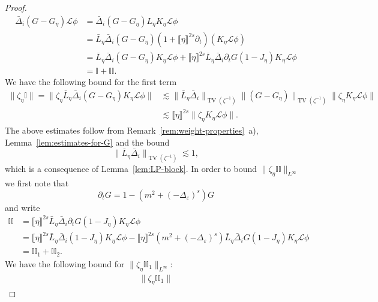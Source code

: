 \documentclass{article}
\numberwithin{equation}{section}
\theoremstyle{plain}
\theoremstyle{definition}
\begin{document}
\begin{proof}
\begin{align*}
    \bar{\Delta}_i  (G - G_{\eta}) \mathcal{L} \phi &=  \bar{\Delta}_i  (G - G_{\eta})
    L_{\eta} K_{\eta} \mathcal{L} \phi\\
 &=  \bar{L}_{\eta} \bar{\Delta}_i  (G - G_{\eta}) (1 + \llbracket \eta
    \rrbracket^{2 s} \partial_t) (K_{\eta} \mathcal{L} \phi)\\
 &=  \bar{L}_{\eta} \bar{\Delta}_i  (G - G_{\eta}) K_{\eta} \mathcal{L}
    \phi + \llbracket \eta \rrbracket^{2 s} \bar{L}_{\eta} \bar{\Delta}_i 
    \partial_t G (1 - J_{\eta}) K_{\eta} \mathcal{L} \phi\\
 &=  \mathbb{I}+\mathbb{I}\mathbb{I}.
  \end{align*}
  We have the following bound for the first term
  \begin{align*}
    \| \zeta_{\eta} \mathbb{I} \| = \| \zeta_{\eta} \bar{L}_{\eta}
    \bar{\Delta}_i  (G - G_{\eta}) K_{\eta} \mathcal{L} \phi \| &\lesssim 
    \| \bar{L}_{\eta} \bar{\Delta}_i  \|_{\operatorname{TV} (\zeta^{- 1})}  \| (G -
    G_{\eta}) \|_{\operatorname{TV} (\zeta^{- 1})} \| \zeta_{\eta} K_{\eta}
    \mathcal{L} \phi \|\\
 &\lesssim  \llbracket \eta \rrbracket^{2 s} \| \zeta_{\eta} K_{\eta}
    \mathcal{L} \phi \| .
  \end{align*}
  The above estimates follow from
  Remark~\ref{rem:weight-properties}~a), Lemma~\ref{lem:estimates-for-G} and
  the bound
  \[ \| \bar{L}_{\eta} \bar{\Delta}_i  \|_{\operatorname{TV} (\zeta^{- 1})} \lesssim
     1, \]
  which is a consequence of Lemma~\ref{lem:LP-block}. In order to bound $\|
  \zeta_{\eta} \mathbb{I}\mathbb{I} \|_{L^{\infty}}$ we first note that
  \[ \partial_t G = 1 - (m^2 + (- \Delta_{\varepsilon})^s) G \]
  and write
  \begin{align*}
    \mathbb{I}\mathbb{I} &=  \llbracket \eta \rrbracket^{2 s} \bar{L}_{\eta}
    \bar{\Delta}_i  \partial_t G (1 - J_{\eta}) K_{\eta} \mathcal{L} \phi\\
 &=  \llbracket \eta \rrbracket^{2 s} \bar{L}_{\eta} \bar{\Delta}_i  (1
    - J_{\eta}) K_{\eta} \mathcal{L} \phi - \llbracket \eta \rrbracket^{2 s}
    (m^2 + (- \Delta_{\varepsilon})^s) \bar{L}_{\eta} \bar{\Delta}_i  G (1 -
    J_{\eta}) K_{\eta} \mathcal{L} \phi\\
 &=  \mathbb{I}\mathbb{I}_1 +\mathbb{I}\mathbb{I}_2 .
  \end{align*}
  We have the following bound for $\| \zeta_{\eta} \mathbb{I}\mathbb{I}_1
  \|_{L^{\infty}}$:
  \begin{align*}
    \| \zeta_{\eta} \mathbb{I}\mathbb{I}_1 \|

\end{align*}
\end{proof}
\end{document}
